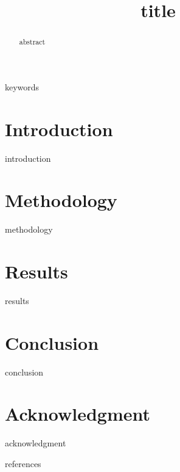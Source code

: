 \documentclass[conference]{IEEEtran}
\begin{document}
\title{{{title}}}

\author{
}

\maketitle

\begin{abstract}
{{abstract}}
\end{abstract}

\begin{IEEEkeywords}
{{keywords}}
\end{IEEEkeywords}

\section{Introduction}
{{introduction}}

\section{Methodology}
{{methodology}}

\section{Results}
{{results}}

\section{Conclusion}
{{conclusion}}

\section*{Acknowledgment}
{{acknowledgment}}

\begin{thebibliography}{1}
{{references}}
\end{thebibliography}
\end{document}
